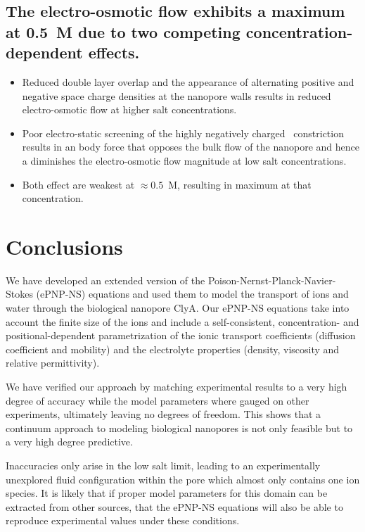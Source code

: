 \documentclass[journal=ancac3,manuscript=article,etalmode=truncate,maxauthors=0,layout=twocolumn]{achemso}
\begin{document}
\subsection{The electro-osmotic flow exhibits a maximum at 0.5~M due to two competing concentration-dependent
effects.}

\begin{itemize}
  \item Reduced double layer overlap and the appearance of alternating positive and negative space charge
  densities at the nanopore walls results in reduced electro-osmotic flow at higher salt concentrations.
  \item Poor electro-static screening of the highly negatively charged \trans\ constriction
  results in an body force that opposes the bulk flow of the nanopore and hence a diminishes the
  electro-osmotic flow magnitude at low salt concentrations.
  \item Both effect are weakest at $\approx0.5$~M, resulting in maximum at that concentration.
\end{itemize}

\section{Conclusions}\label{sec:conclusions}
We have developed an extended version of the Poison-Nernst-Planck-Navier-Stokes (ePNP-NS) equations and used
them to model the transport of ions and water through the biological nanopore ClyA. Our ePNP-NS equations take
into account the finite size of the ions and include a self-consistent, concentration- and
positional-dependent parametrization of the ionic transport coefficients (diffusion coefficient and mobility)
and the electrolyte properties (density, viscosity and relative permittivity).

We have verified our approach by matching experimental results to a very high degree of accuracy while
the model parameters where gauged on other experiments, ultimately leaving no degrees of freedom. This shows
that a continuum approach to modeling biological nanopores is not only feasible but to a very high degree
predictive.

Inaccuracies only arise in the low salt limit, leading to an experimentally unexplored fluid configuration
within the pore which almost only contains one ion species. It is likely that if proper model parameters for
this domain can be extracted from other sources, that the ePNP-NS equations will also be able to reproduce
experimental values under these conditions.
\end{document}

